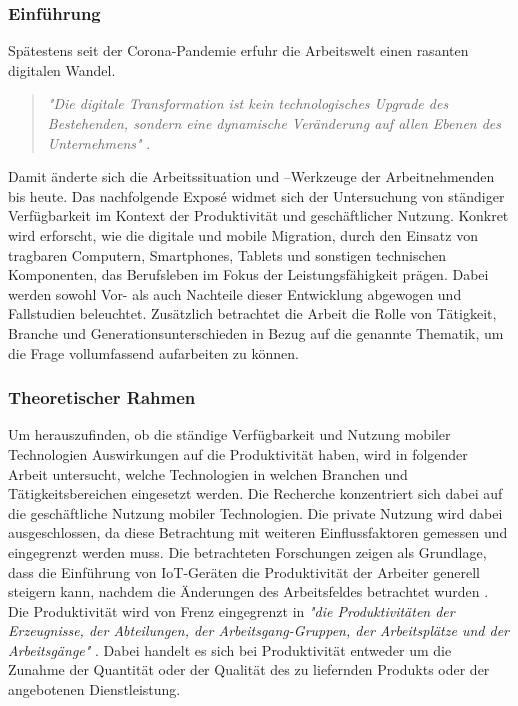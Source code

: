 \documentclass[12pt,a4paper]{article}
\title{\titlename}
\author{Reichard, Pia~~~Berger, Vivian~~~Engelhardt, Philipp~~~Müller, Maximilian}
\date{\exposedate}
\begin{document}

\maketitle 
\thispagestyle{empty} %
\newpage	

\subsubsection*{Einführung }
Spätestens seit der Corona-Pandemie erfuhr die Arbeitswelt einen rasanten digitalen Wandel.

\begin{quote}
\emph{"Die digitale Transformation ist kein technologisches Upgrade des Bestehenden, sondern eine dynamische Veränderung auf allen Ebenen des Unternehmens"} \parencite{frauenhofer}.
\end{quote}

Damit änderte sich die Arbeitssituation und –Werkzeuge der Arbeitnehmenden bis heute. Das nachfolgende Exposé widmet sich der Untersuchung von ständiger Verfügbarkeit im Kontext der Produktivität und geschäftlicher Nutzung. Konkret wird erforscht, wie die digitale und mobile Migration, durch den Einsatz von tragbaren Computern, Smartphones, Tablets und sonstigen technischen Komponenten, das Berufsleben im Fokus der Leistungsfähigkeit prägen. Dabei werden sowohl Vor- als auch Nachteile dieser Entwicklung abgewogen und Fallstudien beleuchtet. Zusätzlich betrachtet die Arbeit die Rolle von Tätigkeit, Branche und Generationsunterschieden in Bezug auf die genannte Thematik, um die Frage vollumfassend aufarbeiten zu können.

\subsubsection*{Theoretischer Rahmen}
Um herauszufinden, ob die ständige Verfügbarkeit und Nutzung mobiler Technologien Auswirkungen auf die Produktivität haben, wird in folgender Arbeit untersucht, welche Technologien in welchen Branchen und Tätigkeitsbereichen eingesetzt werden. 
Die Recherche konzentriert sich dabei auf die geschäftliche Nutzung mobiler Technologien.  
Die private Nutzung wird dabei ausgeschlossen, da diese Betrachtung mit weiteren Einflussfaktoren gemessen und eingegrenzt werden muss.
Die betrachteten Forschungen zeigen als Grundlage, dass die Einführung von IoT-Geräten die Produktivität der Arbeiter generell steigern kann, nachdem die Änderungen des Arbeitsfeldes betrachtet wurden \parencite[vgl.][]{nappi2020internet}.
Die Produktivität wird von Frenz eingegrenzt in \emph{"die Produktivitäten der Erzeugnisse, der Abteilungen, der Arbeitsgang-Gruppen, der Arbeitsplätze und der Arbeitsgänge"} \parencite{frenz1963definition}.
Dabei handelt es sich bei Produktivität entweder um die Zunahme der Quantität oder der Qualität des zu liefernden Produkts oder der angebotenen Dienstleistung. 
\end{document}
